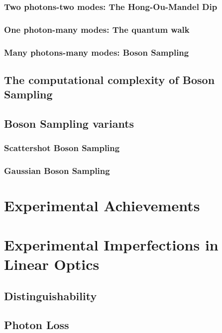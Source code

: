 \subsubsection{Two photons-two modes: The Hong-Ou-Mandel Dip}

\subsubsection{One photon-many modes: The quantum walk}

\subsubsection{Many photons-many modes: Boson Sampling}

\subsection{The computational complexity of Boson Sampling}

\subsection{Boson Sampling variants}

\subsubsection{Scattershot Boson Sampling}

\subsubsection{Gaussian Boson Sampling}

\section{Experimental Achievements}

\section{Experimental Imperfections in Linear Optics}

\subsection{Distinguishability}

\subsection{Photon Loss}

